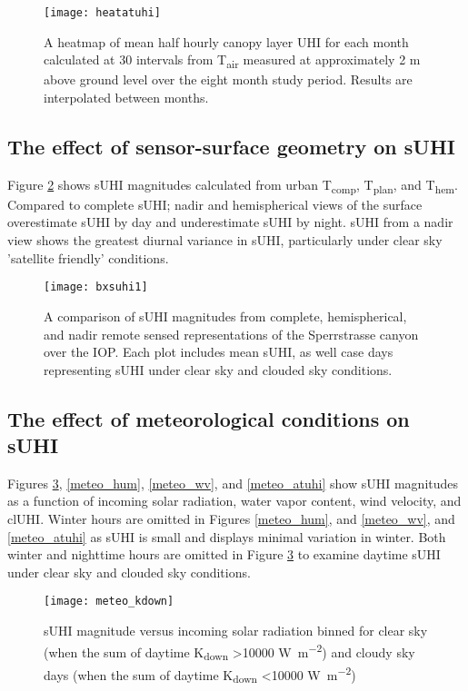 \begin{bibunit}
\begin{figure}[H]
	\centering
	\texttt{[image: heatatuhi]}
	\caption{A heatmap of mean half hourly canopy layer UHI for each month calculated at 30 \si{\min} intervals from T\textsubscript{air} measured at approximately 2 \si{\meter} above ground level over the eight month study period. Results are interpolated between months.}
	\label{heatcluhi}
\end{figure}

\subsection{The effect of sensor-surface geometry on sUHI}

Figure \ref{bx_suhi_compare} shows sUHI magnitudes calculated from urban T\textsubscript{comp}, T\textsubscript{plan}, and T\textsubscript{hem}. Compared to complete sUHI; nadir and hemispherical views of the surface overestimate sUHI by day and underestimate sUHI by night. sUHI from a nadir view shows the greatest diurnal variance in sUHI, particularly under clear sky 'satellite friendly' conditions. 

\begin{figure}[H]
	\centering
	\texttt{[image: bxsuhi1]}
	\caption{A comparison of sUHI magnitudes from complete, hemispherical, and nadir remote sensed representations of the Sperrstrasse canyon over the IOP. Each plot includes mean sUHI, as well case days representing sUHI under clear sky and clouded sky conditions.}
	\label{bx_suhi_compare}
\end{figure}

\subsection{The effect of meteorological conditions on sUHI}

Figures \ref{meteo_kdown}, \ref{meteo_hum}, \ref{meteo_wv}, and \ref{meteo_atuhi} show sUHI magnitudes as a function of incoming solar radiation, water vapor content, wind velocity, and clUHI. Winter hours are omitted in Figures \ref{meteo_hum}, and \ref{meteo_wv}, and \ref{meteo_atuhi} as sUHI is small and displays minimal variation in winter. Both winter and nighttime hours are omitted in Figure \ref{meteo_kdown} to examine daytime sUHI under clear sky and clouded sky conditions.

\begin{figure}[H]
	\centering
	\texttt{[image: meteo\_kdown]}
	\caption{sUHI magnitude versus incoming solar radiation binned for clear sky (when the sum of daytime K\textsubscript{down} \textgreater 10000 \si{\watt \per \square \meter}) and cloudy sky days (when the sum of daytime K\textsubscript{down} \textless 10000 \si{\watt \per \square \meter})}
	\label{meteo_kdown}
\end{figure}


\end{bibunit}

